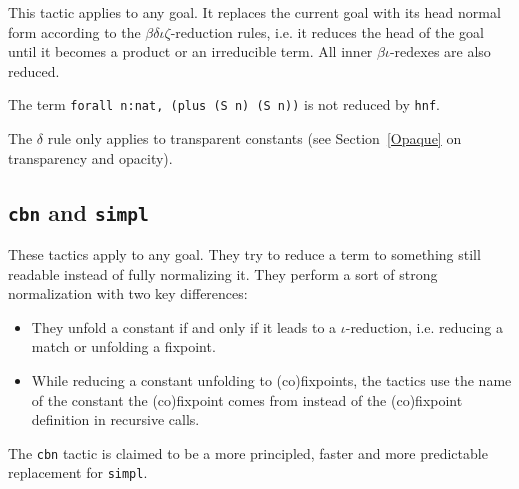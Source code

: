 \begin{coq_example*}
This tactic applies to any goal. It replaces the current goal with its
head normal form according to the $\beta\delta\iota\zeta$-reduction
rules, i.e.  it reduces the head of the goal until it becomes a
product or an irreducible term. All inner $\beta\iota$-redexes are also
reduced.

\Example
The term \verb+forall n:nat, (plus (S n) (S n))+ is not reduced by {\tt hnf}.

\Rem The $\delta$ rule only applies to transparent constants
(see Section~\ref{Opaque} on transparency and opacity).

\subsection{\texorpdfstring{\texttt{cbn}}{cbn} and \texorpdfstring{\texttt{simpl}}{simpl}}
 

These tactics apply to any goal. They try to reduce a term to
something still readable instead of fully normalizing it. They perform
a sort of strong normalization with two key differences:
\begin{itemize}
\item They unfold a constant if and only if it leads to a
  $\iota$-reduction, i.e. reducing a match or unfolding a fixpoint.
\item While reducing a constant unfolding to (co)fixpoints, 
  the tactics use the name of the
  constant the (co)fixpoint comes from instead of the (co)fixpoint
  definition in recursive calls.
\end{itemize}

The \texttt{cbn} tactic is claimed to be a more principled, faster and more
predictable replacement for \texttt{simpl}.


\end{coq_example*}
